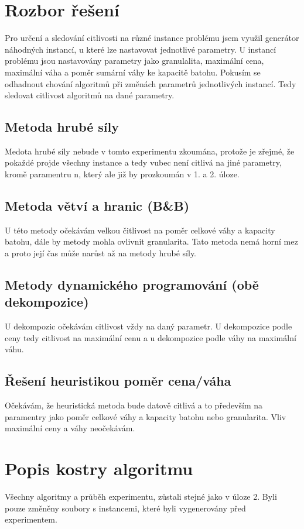 \documentclass[11pt]{article}
\begin{document}
\section{Rozbor řešení}\label{kap:1}
Pro určení a sledování citlivosti na různé instance problému jsem využil generátor náhodných instancí, u které lze nastavovat jednotlivé parametry. U instancí problému jsou nastavovány parametry jako granulalita, maximální cena, maximální váha a poměr sumární váhy ke kapacitě batohu. Pokusím se odhadnout chování algoritmů při změnách parametrů jednotlivých instancí. Tedy sledovat citlivost algoritmů na dané parametry. 
\subsection{Metoda hrubé síly}
Medota hrubé síly nebude v tomto experimentu zkoumána, protože je zřejmé, že pokaždé projde všechny instance a tedy vubec není citlivá na jiné parametry, kromě paramentru n, který ale již by prozkoumán v 1. a 2. úloze.


\subsection{Metoda větví a hranic (B\&B)} 
U této metody očekávám velkou čitlivost na poměr celkové váhy a kapacity batohu, dále by metody mohla ovlivnit granularita. Tato metoda nemá horní mez a proto její čas může narůst až na metody hrubé síly. 

\subsection{Metody dynamického programování (obě dekompozice)}
U dekompozic očekávám citlivost vždy na daný parametr. U dekompozice podle ceny tedy citlivost na maximální cenu a u dekompozice podle váhy na maximální váhu. 

\subsection{Řešení heuristikou poměr cena/váha}
Očekávám, že heuristická metoda bude datově citlivá a to především na paramentry jako poměr celkové váhy a kapacity batohu nebo granularita. Vliv maximální ceny a váhy neočekávám.




\section{Popis kostry algoritmu}\label{kap:2}
Všechny algoritmy a průběh experimentu, zůstali stejné jako v úloze 2. Byli pouze změněny soubory s instancemi, které byli vygenerovány před experimentem.
\end{document}
